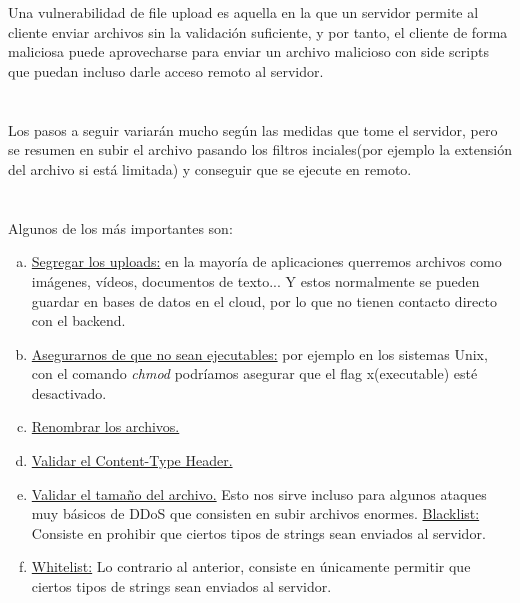 \documentclass[12pt,a4paper,oneside,onecolumn]{article}
\begin{document}
 
    \section{}
    Una vulnerabilidad de file upload es aquella en la que un servidor permite al cliente enviar archivos sin la validaci\'on suficiente, y por tanto, el cliente de forma maliciosa puede aprovecharse para enviar un archivo malicioso con side scripts que puedan incluso darle acceso remoto al servidor.
    \section{}
    Los pasos a seguir variar\'an mucho seg\'un las medidas que tome el servidor, pero se resumen en subir el archivo pasando los filtros inciales(por ejemplo la extensi\'on del archivo si est\'a limitada) y conseguir que se ejecute en remoto.
    \section{}
    Algunos de los m\'as importantes son:
    \begin{enumerate}[a)]
        \item
        \underline {Segregar los uploads:} en la mayor\'ia de aplicaciones querremos archivos como im\'agenes, v\'ideos, documentos de texto... Y estos normalmente se pueden guardar en bases de datos en el cloud, por lo que no tienen contacto directo con el backend.
        \item
        \underline{Asegurarnos de que no sean ejecutables:} por ejemplo en los sistemas Unix, con el comando \emph{chmod} podr\'iamos asegurar que el flag x(executable) est\'e desactivado.
        \item
        \underline{Renombrar los archivos.}
        \item
        \underline{Validar el Content-Type Header.}
        \item
        \underline{Validar el tama\~no del archivo.} Esto nos sirve incluso para algunos ataques muy b\'asicos de DDoS que consisten en subir archivos enormes.
        \underline{Blacklist:} Consiste en prohibir que ciertos tipos de strings sean enviados al servidor.
        \item
        \underline{Whitelist:} Lo contrario al anterior, consiste en \'unicamente permitir que ciertos tipos de strings sean enviados al servidor.
    \end{enumerate}
    
\end{document}
